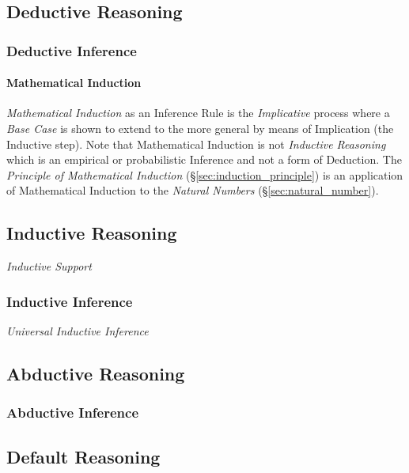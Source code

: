 \subsection{Deductive Reasoning}\label{sec:deductive_reasoning}

\subsubsection{Deductive Inference}\label{sec:deductive_inference}

\paragraph{Mathematical Induction}\label{sec:mathematical_induction}

\emph{Mathematical Induction} as an Inference Rule is the
\emph{Implicative} process where a \emph{Base Case} is shown to extend
to the more general by means of Implication (the Inductive step). Note
that Mathematical Induction is not \emph{Inductive Reasoning} which is
an empirical or probabilistic Inference and not a form of Deduction.
The \emph{Principle of Mathematical Induction}
(\S\ref{sec:induction_principle}) is an application of Mathematical
Induction to the \emph{Natural Numbers} (\S\ref{sec:natural_number}).



\subsection{Inductive Reasoning}\label{sec:inductive_reasoning}
\cite{hawthorne08}

\emph{Inductive Support}

\subsubsection{Inductive Inference}\label{sec:inductive_inference}

\emph{Universal Inductive Inference}



\subsection{Abductive Reasoning}\label{sec:abductive_reasoning}

\subsubsection{Abductive Inference}\label{sec:abductive_inference}



\subsection{Default Reasoning}\label{sec:default_reasoning}
